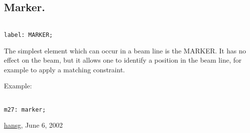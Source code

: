 




\subsection{Marker.}
\begin{verbatim}

label: MARKER;
\end{verbatim} The simplest element which can occur in a beam line is the MARKER. It has no effect on the beam, but it allows one to identify a position in the beam line, for example to apply a matching constraint. 

 Example: 
\begin{verbatim}

m27: marker;
\end{verbatim}\href{http://www.cern.ch/Hans.Grote/hansg_sign.html}{hansg}, June 6, 2002 

